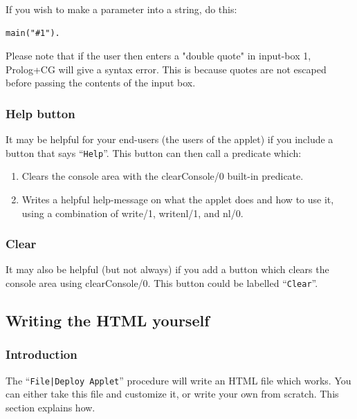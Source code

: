 \documentclass{book}
\begin{document}
If you wish to make a parameter into a string, do this:


\begin{verbatim}
main("#1").
\end{verbatim}


Please note that if the user then enters a "double quote" in input-box
1, Prolog+CG will give a syntax error.  This is because quotes are not
escaped before passing the contents of the input box.

\subsubsection{Help button}

It may be helpful for your end-users (the users of the applet) if you
include a button that says ``\texttt{Help}''.  This button can then
call a predicate which:

\begin{enumerate}

  \item Clears the console area with the clearConsole/0 built-in
  predicate.

  \item Writes a helpful help-message on what the applet does and how
  to use it, using a combination of write/1, writenl/1, and nl/0.

\end{enumerate}


\subsubsection{Clear}

It may also be helpful (but not always) if you add a button which
clears the console area using clearConsole/0.  This button could be
labelled ``\texttt{Clear}''.


\subsection{Writing the HTML yourself}

\subsubsection{Introduction}

The ``\texttt{File|Deploy Applet}'' procedure will write an HTML file
which works.  You can either take this file and customize it, or write
your own from scratch.  This section explains how.
\end{document}
